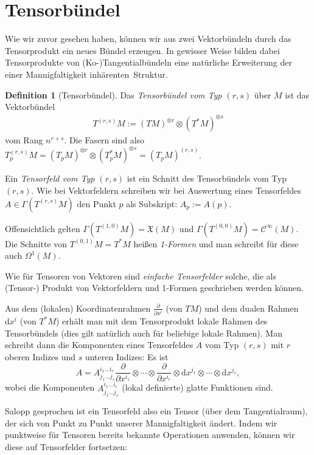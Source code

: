 \documentclass[a4paper]{scrbook}
\numberwithin{equation}{chapter}
\newcommand{\D}{\mathrm{d}}
\newcommand{\sC}{\mathcal{C}^{\infty}}
\newcommand{\vf}{\mathfrak{X}}
\theoremstyle{definition}
\newtheorem{defn}{Definition}[section]
\begin{document}
	\section{Tensorbündel}
		Wie wir zuvor gesehen haben, können wir aus zwei Vektorbündeln durch das Tensorprodukt ein neues Bündel erzeugen. In gewisser Weise bilden dabei Tensorprodukte von (Ko-)Tangentialbündeln eine natürliche Erweiterung der einer Mannigfaltigkeit \glqq inhärenten\grqq\ Struktur.
	\begin{defn}[Tensorbündel]
	Das \emph{Tensorbündel vom Typ $(r,s)$} über $M$ ist das Vektorbündel
	\begin{align*}
		T^{(r,s)}M := (TM)^{\otimes r} \otimes (T^*M)^{\otimes s}
	\end{align*}
	vom Rang $n^{r+s}$. Die Fasern sind also $T^{(r,s)}_pM = (T_pM)^{\otimes r} \otimes (T_p^*M)^{\otimes s} = (T_pM)^{(r,s)}$.

	Ein \emph{Tensorfeld vom Typ $(r,s)$} ist ein Schnitt des Tensorbündels vom Typ $(r,s)$. Wie bei Vektorfeldern schreiben wir bei Auswertung eines Tensorfeldes $A \in \Gamma(T^{(r,s)}M)$ den Punkt $p$ als Subskript: $A_p := A(p)$.

Offensichtlich gelten $\Gamma(T^{(1,0)}M)=\vf(M)$ und $\Gamma(T^{(0,0)}M)=\sC(M)$. Die Schnitte von $T^{(0,1)}M=T^*M$ heißen \emph{1-Formen} und man schreibt für diese auch $\Omega^1(M)$.
			
			Wie für Tensoren von Vektoren sind \emph{einfache Tensorfelder} solche, die als (Tensor-) Produkt von Vektorfeldern und 1-Formen geschrieben werden können.
			
			Aus dem (lokalen) Koordinatenrahmen $\frac{\partial}{\partial x^i}$ (von $TM$) und dem dualen Rahmen $\D x^i$ (von $T^*M$) erhält man mit dem Tensorprodukt lokale Rahmen des Tensorbündels (dies gilt natürlich auch für beliebige lokale Rahmen). Man schreibt dann die Komponenten eines Tensorfeldes $A$ vom Typ $(r,s)$ mit $r$ oberen Indizes und $s$ unteren Indizes: Es ist
			\[A = A^{i_1\ldots i_r}_{j_1\ldots j_s} \frac{\partial}{\partial x^{i_1}} \otimes \cdots \otimes \frac{\partial}{\partial x^{i_r}} \otimes \D x^{j_1} \otimes \cdots \otimes \D x^{j_s},\]
			wobei die Komponenten $A^{i_1\ldots i_r}_{j_1\ldots j_s}$ (lokal definierte) glatte Funktionen sind.
		\end{defn}
		Salopp gesprochen ist ein Tensorfeld also ein Tensor (über dem Tangentialraum), der sich von Punkt zu Punkt unserer Mannigfaltigkeit ändert. Indem wir punktweise für Tensoren bereits bekannte Operationen anwenden, können wir diese auf Tensorfelder fortsetzen:
\end{document}
